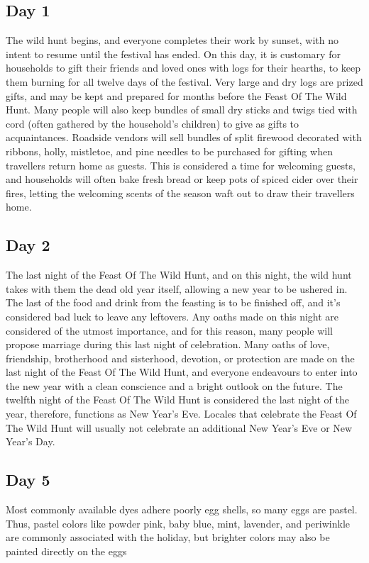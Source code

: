 \documentclass[10pt,a4paper,twoside,bg=print,twocolumn,openany,nodeprecatedcode]{dndbook}
\begin{document}
\subsection{Day 1}
The wild hunt begins, and everyone completes their work by sunset, with no intent to resume until the festival has ended. On this day, it is customary for households to gift their friends and loved ones with logs for their hearths, to keep them burning for all twelve days of the festival. Very large and dry logs are prized gifts, and may be kept and prepared for months before the Feast Of The Wild Hunt. Many people will also keep bundles of small dry sticks and twigs tied with cord (often gathered by the household's children) to give as gifts to acquaintances. Roadside vendors will sell bundles of split firewood decorated with ribbons, holly, mistletoe, and pine needles to be purchased for gifting when travellers return home as guests. This is considered a time for welcoming guests, and households will often bake fresh bread or keep pots of spiced cider over their fires, letting the welcoming scents of the season waft out to draw their travellers home.
\subsection{Day 2}
The last night of the Feast Of The Wild Hunt, and on this night, the wild hunt takes with them the dead old year itself, allowing a new year to be ushered in. The last of the food and drink from the feasting is to be finished off, and it's considered bad luck to leave any leftovers. Any oaths made on this night are considered of the utmost importance, and for this reason, many people will propose marriage during this last night of celebration. Many oaths of love, friendship, brotherhood and sisterhood, devotion, or protection are made on the last night of the Feast Of The Wild Hunt, and everyone endeavours to enter into the new year with a clean conscience and a bright outlook on the future.
The twelfth night of the Feast Of The Wild Hunt is considered the last night of the year, therefore, functions as New Year's Eve. Locales that celebrate the Feast Of The Wild Hunt will usually not celebrate an additional New Year's Eve or New Year's Day.
\subsection{Day 5}
Most commonly available dyes adhere poorly egg shells, so many eggs are pastel. Thus, pastel colors like powder pink, baby blue, mint, lavender, and periwinkle are commonly associated with the holiday, but brighter colors may also be painted directly on the eggs
\end{document}
